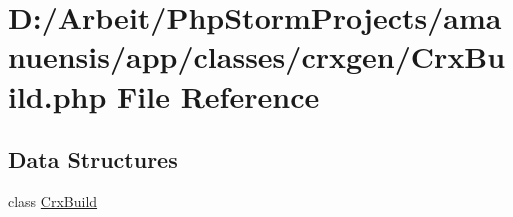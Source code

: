 \hypertarget{a00087}{}\section{D\+:/\+Arbeit/\+Php\+Storm\+Projects/amanuensis/app/classes/crxgen/\+Crx\+Build.php File Reference}
\label{a00087}
\subsection*{Data Structures}
\begin{DoxyCompactItemize}
\item 
class \hyperlink{a00021}{Crx\+Build}
\end{DoxyCompactItemize}
